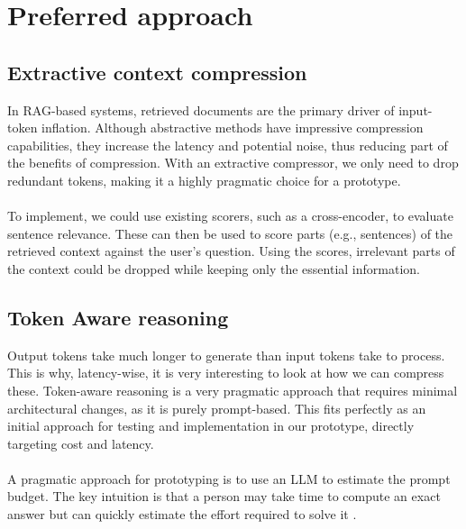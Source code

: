 \documentclass[pdflatex,sn-mathphys-num,oneside]{sn-jnl}%
\theoremstyle{thmstyleone}%
\theoremstyle{thmstyletwo}%
\theoremstyle{thmstylethree}%
\begin{document}
\section{Preferred approach}\label{sec2}
\subsection{Extractive context compression}\label{subsec22}
In RAG-based systems, retrieved documents are the primary driver of input-token inflation. 
Although abstractive methods have impressive compression capabilities, they increase the latency and potential noise, thus reducing part of the benefits of compression.
With an extractive compressor, we only need to drop redundant tokens, making it a highly pragmatic choice for a prototype. 
\\ \\
To implement, we could use existing scorers, such as a cross-encoder, to evaluate sentence relevance. 
These can then be used to score parts (e.g., sentences) of the retrieved context against the user's question. 
Using the scores, irrelevant parts of the context could be dropped while keeping only the essential information.

\subsection{Token Aware reasoning}\label{subsec21}
Output tokens take much longer to generate than input tokens take to process. 
This is why, latency-wise, it is very interesting to look at how we can compress these.
Token-aware reasoning is a very pragmatic approach that requires minimal architectural changes, as it is purely prompt-based.
This fits perfectly as an initial approach for testing and implementation in our prototype, directly targeting cost and latency.
\\ \\
A pragmatic approach for prototyping is to use an LLM to estimate the prompt budget. 
The key intuition is that a person may take time to compute an exact answer but can quickly estimate the effort required to solve it \cite{rbudget}.
\end{document}

